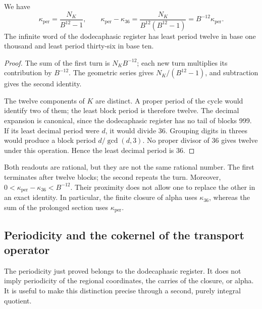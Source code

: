 \begin{proposition}
\label{prop:k-periodo}
We have
\begin{equation}
 \kappa_{\mathrm{per}}=\frac{N_K}{B^{12}-1},\qquad
 \kappa_{\mathrm{per}}-\kappa_{36}
 =\frac{N_K}{B^{12}(B^{12}-1)}
 =B^{-12}\kappa_{\mathrm{per}}.
 \label{eq:k-diferencia-kappas}
\end{equation}
The infinite word of the dodecaphasic register has least period twelve in base one thousand and
least period thirty-six in base ten.
\end{proposition}

\begin{proof}
The sum of the first turn is \(N_KB^{-12}\); each new turn
multiplies its contribution by \(B^{-12}\). The geometric series gives
\(N_K/(B^{12}-1)\), and subtraction gives the second identity.

The twelve components of \(K\) are distinct. A proper period of the cycle
would identify two of them; the least block period is therefore
twelve. The decimal expansion is canonical, since the dodecaphasic register has no tail
of blocks 999. If its least decimal period were \(d\), it would divide
36. Grouping digits in threes would produce a block period
\(d/\gcd(d,3)\). No proper divisor of 36 gives twelve under this
operation. Hence the least decimal period is 36.
\end{proof}

Both readouts are rational, but they are not the same rational number. The first
terminates after twelve blocks; the second repeats the turn. Moreover,
\(0<\kappa_{\mathrm{per}}-\kappa_{36}<B^{-12}\). Their proximity does not
allow one to replace the other in an exact identity. In particular,
the finite closure of alpha uses \(\kappa_{36}\), whereas the
sum of the prolonged section uses \(\kappa_{\mathrm{per}}\).



\subsection{Periodicity and the cokernel of the transport operator}
\label{subsec:k-clase-acarreo}

The periodicity just proved belongs to the dodecaphasic register. It does not imply
periodicity of the regional coordinates, the carries of the closure,
or alpha. It is useful to make this distinction precise through a second,
purely integral quotient.

